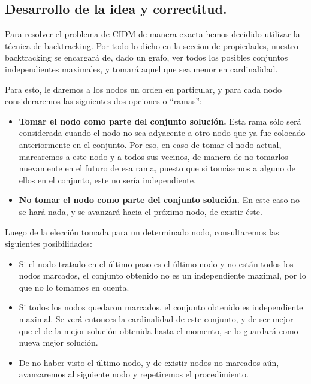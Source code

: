 \subsection{Desarrollo de la idea y correctitud.}

\vspace*{0.3cm}

Para resolver el problema de CIDM de manera exacta hemos decidido utilizar la técnica de backtracking. Por todo lo dicho en la seccion de propiedades, nuestro backtracking se encargará de, dado un grafo, ver todos los posibles conjuntos independientes maximales, y tomará aquel que sea menor en cardinalidad. 

Para esto, le daremos a los nodos un orden en particular, y para cada nodo consideraremos las siguientes dos opciones o ``ramas'':

\begin{itemize}
	\item {\bf Tomar el nodo como parte del conjunto solución.} Esta rama sólo será considerada cuando el nodo no sea adyacente a otro nodo que ya fue colocado anteriormente en el conjunto.  Por eso, en caso de tomar el nodo actual, marcaremos a este nodo y a todos sus vecinos, de manera de no tomarlos nuevamente en el futuro de esa rama, puesto que si tomásemos a alguno de ellos en el conjunto, este no sería independiente. 
	\item {\bf No tomar el nodo como parte del conjunto solución.}  En este caso no se hará nada, y se avanzará hacia el próximo nodo, de existir éste.
\end{itemize}

Luego de la elección tomada para un determinado nodo, consultaremos las siguientes posibilidades:

\begin{itemize}
	\item Si el nodo tratado en el último paso es el último nodo y no están todos los nodos marcados, el conjunto obtenido no es un independiente maximal, por lo que no lo tomamos en cuenta.
	\item Si todos los nodos quedaron marcados, el conjunto obtenido es independiente maximal.  Se verá entonces la cardinalidad de este conjunto, y de ser mejor que el de la mejor solución obtenida hasta el momento, se lo guardará como nueva mejor solución.
	\item De no haber visto el último nodo, y de existir nodos no marcados aún, avanzaremos al siguiente nodo y repetiremos el procedimiento.
\end{itemize}

